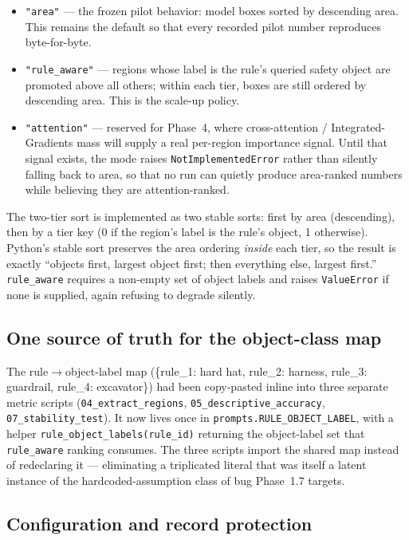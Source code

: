 \begin{itemize}
  \item \texttt{"area"} --- the frozen pilot behavior: model boxes sorted by descending area. This
  remains the default so that every recorded pilot number reproduces byte-for-byte.
  \item \texttt{"rule\_aware"} --- regions whose label is the rule's queried safety object are
  promoted above all others; within each tier, boxes are still ordered by descending area. This is
  the scale-up policy.
  \item \texttt{"attention"} --- reserved for Phase~4, where cross-attention / Integrated-Gradients
  mass will supply a real per-region importance signal. Until that signal exists, the mode raises
  \texttt{NotImplementedError} rather than silently falling back to area, so that no run can quietly
  produce area-ranked numbers while believing they are attention-ranked.
\end{itemize}

The two-tier sort is implemented as two stable sorts: first by area (descending), then by a tier key
(0 if the region's label is the rule's object, 1 otherwise). Python's stable sort preserves the area
ordering \emph{inside} each tier, so the result is exactly ``objects first, largest object first;
then everything else, largest first.'' \texttt{rule\_aware} requires a non-empty set of object
labels and raises \texttt{ValueError} if none is supplied, again refusing to degrade silently.

\subsection{One source of truth for the object-class map}

The rule$\rightarrow$object-label map (\{rule\_1: hard hat, rule\_2: harness, rule\_3: guardrail,
rule\_4: excavator\}) had been copy-pasted inline into three separate metric scripts
(\texttt{04\_extract\_regions}, \texttt{05\_descriptive\_accuracy}, \texttt{07\_stability\_test}).
It now lives once in \texttt{prompts.RULE\_OBJECT\_LABEL}, with a helper
\texttt{rule\_object\_labels(rule\_id)} returning the object-label set that \texttt{rule\_aware}
ranking consumes. The three scripts import the shared map instead of redeclaring it --- eliminating a
triplicated literal that was itself a latent instance of the hardcoded-assumption class of bug
Phase~1.7 targets.

\subsection{Configuration and record protection}

